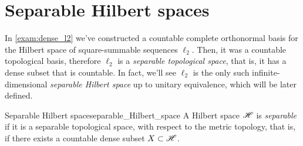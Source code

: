 \section{Separable Hilbert spaces}
In \cref{exam:dense_l2} we've constructed a countable complete orthonormal basis for the Hilbert space of square-summable sequences \(\ell_2\). Then, it was a countable topological basis, therefore \(\ell_2\) is a \emph{separable topological space}, that is, it has a dense subset that is countable. In fact, we'll see \(\ell_2\) is the only such infinite-dimensional \emph{separable Hilbert space} up to unitary equivalence, which will be later defined.
\begin{definition}{Separable Hilbert space}{separable_Hilbert_space}
    A Hilbert space \(\mathscr{H}\) is \emph{separable} if it is a separable topological space, with respect to the metric topology, that is, if there exists a countable dense subset \(X \subset \mathscr{H}\).
\end{definition}


